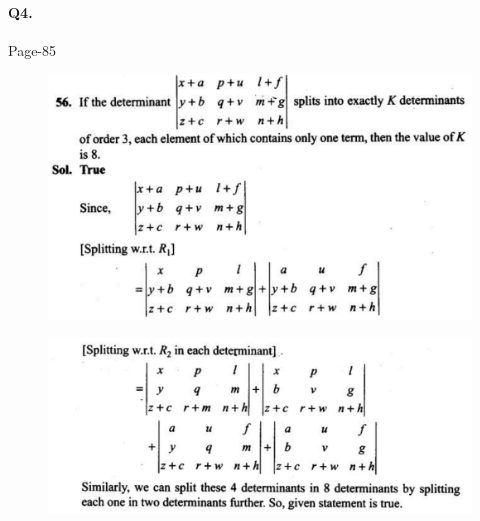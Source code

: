 \documentclass{article}
\begin{document}
\paragraph{Q4.}
\begin{flushright}
Page-85
\end{flushright}
\begin{figure}[H]
    \includegraphics[scale=0.5]{determinants_l5_ps_41.png}
\end{figure}
\begin{figure}[H]
    \includegraphics[scale=0.5]{determinants_l5_ps_42.png}
\end{figure}
\end{document}
